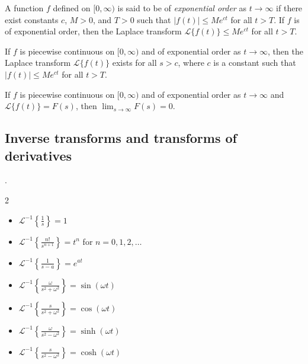 \documentclass{article}
\begin{document}
\begin{defn} 
    A function \(f\) defined on \([0, \infty)\) is said to be of \emph{exponential order} as \(t\to\infty\) if there exist constants \(c\), \(M > 0\), and \(T > 0\) such that \(\vert f(t) \vert \leq M e^{ct}\) for all \(t > T\). If \(f\) is of exponential order, then the Laplace transform \(\mathcal{L} \{f(t)\} \leq Me^{ct}\) for all \(t > T\).
\end{defn}

\begin{thm} 
    If \(f\) is piecewise continuous on \([0, \infty)\) and of exponential order as \(t \to \infty\), then the Laplace transform \(\mathcal{L} \{f(t)\}\) exists for all \(s > c\), where \(c\) is a constant such that \(\vert f(t) \vert \leq Me^{ct}\) for all \(t > T\).
\end{thm}

\begin{thm} 
    If \(f\) is piecewise continuous on \([0, \infty)\) and of exponential order as \(t \to \infty\) and \(\mathcal{L} \{f(t)\} = F(s)\), then \(\displaystyle\lim_{s \to \infty} F(s) = 0\).
\end{thm}

\subsection{Inverse transforms and transforms of derivatives}

\begin{thm} .
    \begin{multicols}{2}
    \begin{itemize}
        \item [(a)] \(\displaystyle\mathcal{L}^{-1} \left\{ \frac{1}{s} \right\} = 1\)
        \item [(b)] \(\displaystyle\mathcal{L}^{-1} \left\{ \frac{n!}{s^{n+1}} \right\} = t^n\) for \(n = 0, 1, 2, \ldots\)
        \item [(c)] \(\displaystyle\mathcal{L}^{-1} \left\{ \frac{1}{s-a} \right\} = e^{at}\)
        \item [(d)] \(\displaystyle\mathcal{L}^{-1} \left\{ \frac{\omega}{s^2 + \omega^2} \right\} = \sin(\omega t)\)
        \item [(e)] \(\displaystyle\mathcal{L}^{-1} \left\{ \frac{s}{s^2 + \omega^2} \right\} = \cos(\omega t)\)
        \item [(f)] \(\displaystyle\mathcal{L}^{-1} \left\{ \frac{\omega}{s^2 - \omega^2} \right\} = \sinh(\omega t)\)
        \item [(g)] \(\displaystyle\mathcal{L}^{-1} \left\{ \frac{s}{s^2 - \omega^2} \right\} = \cosh(\omega t)\)
    \end{itemize}
    \end{multicols}
\end{thm}
\end{document}
